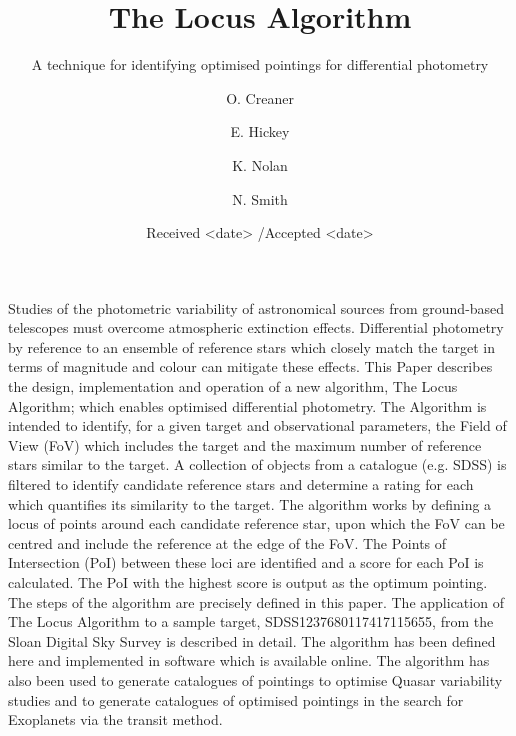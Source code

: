 \documentclass{aa}
\begin{document}

\title{The Locus Algorithm}
\subtitle{A technique for identifying optimised pointings for differential photometry}


\author{O. Creaner
\and
E. Hickey
\and
K. Nolan
\and
N. Smith
}


\date{Received <date> /Accepted <date>}
\abstract{}{}{}{}{} 
\abstract 
  {Studies of the photometric variability of astronomical sources from ground-based telescopes must overcome atmospheric extinction effects.  Differential photometry by reference to an ensemble of reference stars which closely match the target in terms of magnitude and colour can mitigate these effects.}
  {This Paper describes the design, implementation and operation of a new algorithm, The Locus Algorithm; which enables optimised differential photometry.  The Algorithm is intended to identify, for a given target and observational parameters, the Field of View (FoV) which includes the target and the maximum number of reference stars similar to the target.}
   {A collection of objects from a catalogue (e.g. SDSS) is filtered to identify candidate reference stars and determine a rating for each which quantifies its similarity to the target.  The algorithm works by defining a locus of points around each candidate reference star, upon which the FoV can be centred and include the reference at the edge of the FoV.  The Points of Intersection (PoI) between these loci are identified and a score for each PoI is calculated.  The PoI with the highest score is output as the optimum pointing.}
   {The steps of the algorithm are precisely defined in this paper. The application of The Locus Algorithm to a sample target, SDSS1237680117417115655, from the Sloan Digital Sky Survey is described in detail. }
   {The algorithm has been defined here and implemented in software which is available online. The algorithm has also been used to generate catalogues of pointings to optimise Quasar variability studies and to generate catalogues of optimised pointings in the search for Exoplanets via the transit method.}  
\end{document}
